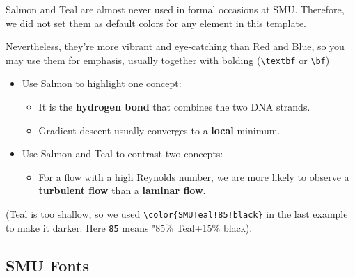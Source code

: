 \documentclass[12pt, aspectratio=169]{beamer}
\begin{document}
\begin{frame}[fragile]{\insertsubsection}
\textcolor{SMUSalmon}{Salmon} and \textcolor{SMUTeal}{Teal} are almost never used in formal occasions at SMU. Therefore, we did not set them as default colors for any element in this template. 

Nevertheless, they're more vibrant and eye-catching than \textcolor{SMURed}{Red} and \textcolor{SMUBlue}{Blue}, so you may use them for emphasis, usually together with bolding (\verb|\textbf| or \verb|\bf|)
\begin{itemize}
    \item Use \textcolor{SMUSalmon}{Salmon} to highlight one concept:
    \begin{itemize}
        \item It is the \textcolor{SMUSalmon}{\bf hydrogen bond} that combines the two DNA strands.
        \item Gradient descent usually converges to a \textcolor{SMUSalmon}{\bf local} minimum.
    \end{itemize}
    
    \item Use \textcolor{SMUSalmon}{Salmon} and \textcolor{SMUTeal}{Teal} to contrast two concepts:
    \begin{itemize}
        \item For a flow with a high Reynolds number, we are more likely to observe a \textcolor{SMUSalmon}{\bf turbulent flow} than a \textcolor{SMUTeal!85!black}{\bf laminar flow}.
    \end{itemize}
\end{itemize}
({\color{SMUTeal}Teal} is too shallow, so we used \verb|\color{SMUTeal!85!black}| in the last example to make it darker. Here \texttt{85} means "85\% Teal+15\% black).
\end{frame}

\subsection{SMU Fonts}
\end{document}
